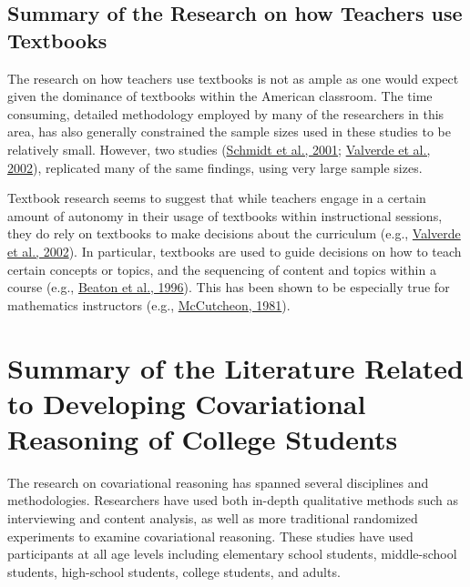 \documentclass[11pt]{umnthesis}
\begin{document}
\hypertarget{summary-of-the-research-on-how-teachers-use-textbooks}{%
\subsection{Summary of the Research on how Teachers use Textbooks}\label{summary-of-the-research-on-how-teachers-use-textbooks}}

The research on how teachers use textbooks is not as ample as one would expect given the dominance of textbooks within the American classroom. The time consuming, detailed methodology employed by many of the researchers in this area, has also generally constrained the sample sizes used in these studies to be relatively small. However, two studies (\protect\hyperlink{ref-schmidt:2001}{Schmidt et al., 2001}; \protect\hyperlink{ref-valverde:2002}{Valverde et al., 2002}), replicated many of the same findings, using very large sample sizes.

Textbook research seems to suggest that while teachers engage in a certain amount of autonomy in their usage of textbooks within instructional sessions, they do rely on textbooks to make decisions about the curriculum (e.g., \protect\hyperlink{ref-valverde:2002}{Valverde et al., 2002}). In particular, textbooks are used to guide decisions on how to teach certain concepts or topics, and the sequencing of content and topics within a course (e.g., \protect\hyperlink{ref-beaton:1996}{Beaton et al., 1996}). This has been shown to be especially true for mathematics instructors (e.g., \protect\hyperlink{ref-mccutcheon:1981}{McCutcheon, 1981}).

\hypertarget{summary-of-the-literature-related-to-developing-covariational-reasoning-of-college-students}{%
\section{Summary of the Literature Related to Developing Covariational Reasoning of College Students}\label{summary-of-the-literature-related-to-developing-covariational-reasoning-of-college-students}}

The research on covariational reasoning has spanned several disciplines and methodologies. Researchers have used both in-depth qualitative methods such as interviewing and content analysis, as well as more traditional randomized experiments to examine covariational reasoning. These studies have used participants at all age levels including elementary school students, middle-school students, high-school students, college students, and adults.
\end{document}
